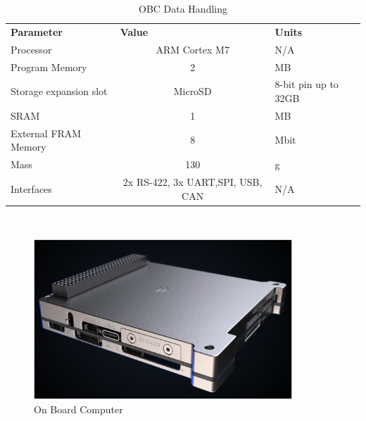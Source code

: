 \begin{table}[hbt!]
\centering
\caption{OBC Data Handling}
\label{Tab:obc}
\begin{tabular}{lcl}
\rowcolor[HTML]{C0C0C0} 
\textbf{Parameter}                                                           & \multicolumn{1}{l}{\cellcolor[HTML]{C0C0C0}\textbf{Value}} & \textbf{Units} \\
Processor         & ARM Cortex M7   & N/A            \\
Program Memory         & 2     & MB             \\
Storage expansion slot & MicroSD    & 8-bit pin up to 32GB \\
SRAM & 1                                                          & MB             \\
External FRAM Memory    & 8   & Mbit           \\
Mass & 130                                     & g              \\
Interfaces & 2x RS-422, 3x  UART,SPI, USB, CAN &  N/A
\end{tabular}
\end{table}\\[.2in]

\begin{figure}[hbt!]
    \vspace{5mm}
    \centering
    \includegraphics[width=\textwidth,frame,height=6cm]{Images/obc.png}
    \caption{On Board Computer}
    \label{fig:obc}
\end{figure}
